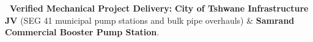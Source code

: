 \vfill

\noindent
\begin{tcolorbox}[enhanced, colback=white, colframe=mhnavy, boxrule=0.8pt, arc=3pt, left=8pt, right=8pt, top=6pt, bottom=6pt, drop shadow=black!3]
    {\fontsize{8pt}{10.6pt}\selectfont\color{mhnavy}\bfseries\faCheckCircle\ Verified Mechanical Project Delivery:}\quad
    {\fontsize{8pt}{10.6pt}\selectfont\color{mhtext}
    \textbf{City of Tshwane Infrastructure JV} (SEG 41 municipal pump stations and bulk pipe overhauls) \& \textbf{Samrand Commercial Booster Pump Station}.
    }
\end{tcolorbox}

\clearpage

